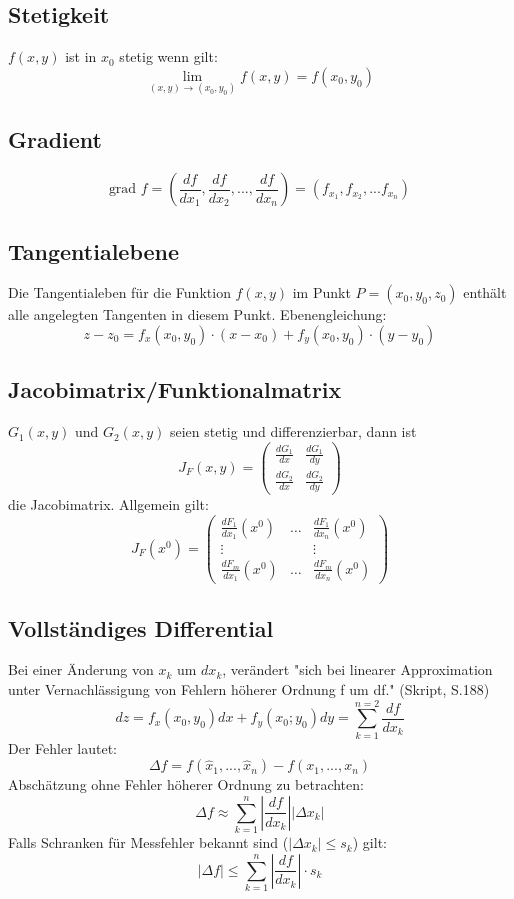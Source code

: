 \documentclass[12pt,a4paper]{article}
\begin{document}
\subsection{Stetigkeit}
$f(x,y)$ ist in $x_0$ stetig wenn gilt:
\[\lim\limits_{(x,y) \to (x_0,y_0)}{f(x,y) = f(x_0,y_0)}\] 

\subsection{Gradient}
\[\text{grad } f = (\frac{df}{dx_1}, \frac{df}{dx_2}, ..., \frac{df}{dx_n}) = (f_{x_1}, f_{x_2}, ... f_{x_n})\]

\subsection{Tangentialebene}
Die Tangentialeben für die Funktion $f(x,y)$ im Punkt $P=(x_0, y_0, z_0)$ enthält alle angelegten Tangenten in diesem Punkt. Ebenengleichung:
\[z-z_0 = f_x(x_0,y_0) \cdot (x-x_0) + f_y(x_0, y_0) \cdot (y-y_0)\]

\subsection{Jacobimatrix/Funktionalmatrix}
$G_1(x,y)$ und $G_2(x,y)$ seien stetig und differenzierbar, dann ist
\[J_F(x,y) = \begin{pmatrix} \frac{dG_1}{dx} &\frac{dG_1}{dy} \\ \frac{dG_2}{dx} & \frac{dG_2}{dy}\end{pmatrix}\]
die Jacobimatrix. Allgemein gilt:
\[J_F(x^0) = \begin{pmatrix}
	\frac{dF_1}{dx_1}(x^0) & \dots & \frac{dF_1}{dx_n}(x^0)\\
	\vdots & & \vdots\\
	\frac{dF_m}{dx_1}(x^0) & \dots & \frac{dF_m}{dx_n}(x^0)
	\end{pmatrix}
\]

\subsection{Vollständiges Differential}
Bei einer Änderung von $x_k$ um $dx_k$, verändert "sich bei linearer Approximation unter Vernachlässigung von Fehlern höherer Ordnung f um df." (Skript, S.188)
\[dz = f_x(x_0, y_0) dx + f_y(x_0;y_0)dy = \sum\limits_{k=1}^{n=2}{\frac{df}{dx_k}}\]
Der Fehler lautet:
\[\Delta f = f(\hat{x}_1,...,\hat{x}_n) - f(x_1, ... ,x_n)\]
Abschätzung ohne Fehler höherer Ordnung zu betrachten:
\[\Delta f \approx \sum\limits_{k=1}^{n}{\left|\frac{df}{dx_k}\right| \left| \Delta x_k \right|}\]
Falls Schranken für Messfehler bekannt sind ($\left| \Delta x_k \right| \leq s_k$) gilt:
\[\left| \Delta f \right| \leq \sum\limits_{k=1}^{n}{\left| \frac{df}{dx_k}\right| \cdot s_k}\]
\end{document}
